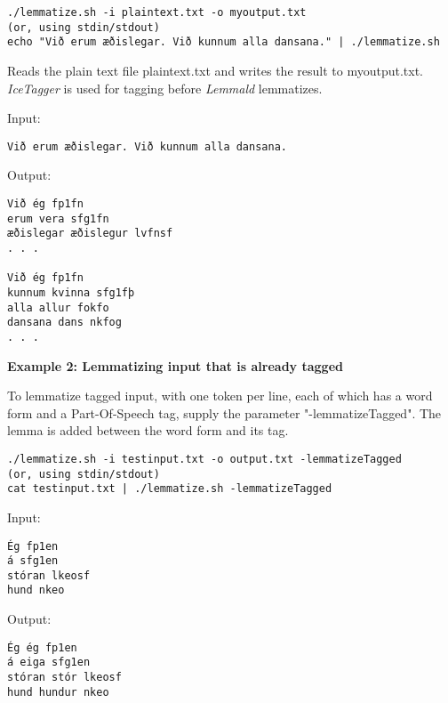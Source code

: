 \documentclass[11pt]{article}
\begin{document}
\begin{verbatim}
./lemmatize.sh -i plaintext.txt -o myoutput.txt
(or, using stdin/stdout)
echo "Við erum æðislegar. Við kunnum alla dansana." | ./lemmatize.sh
\end{verbatim}

Reads the plain text file plaintext.txt and writes the result to myoutput.txt. \textit{IceTagger} is used for tagging
before \textit{Lemmald} lemmatizes.

Input:
\begin{verbatim}
Við erum æðislegar. Við kunnum alla dansana. 
\end{verbatim}

Output:
\begin{verbatim}
Við ég fp1fn
erum vera sfg1fn
æðislegar æðislegur lvfnsf
. . .

Við ég fp1fn
kunnum kvinna sfg1fþ
alla allur fokfo
dansana dans nkfog
. . .
\end{verbatim}

\textbf{Example 2: Lemmatizing input that is already tagged}

To lemmatize tagged input, with one token per line, each of which has a word form and a Part-Of-Speech tag, supply the parameter "-lemmatizeTagged".
The lemma is added between the word form and its tag.

\begin{verbatim}
./lemmatize.sh -i testinput.txt -o output.txt -lemmatizeTagged
(or, using stdin/stdout)
cat testinput.txt | ./lemmatize.sh -lemmatizeTagged 
\end{verbatim}

Input:
\begin{verbatim}
Ég fp1en
á sfg1en
stóran lkeosf
hund nkeo 
\end{verbatim}

Output:
\begin{verbatim}
Ég ég fp1en
á eiga sfg1en
stóran stór lkeosf
hund hundur nkeo 
\end{verbatim}
\end{document}
